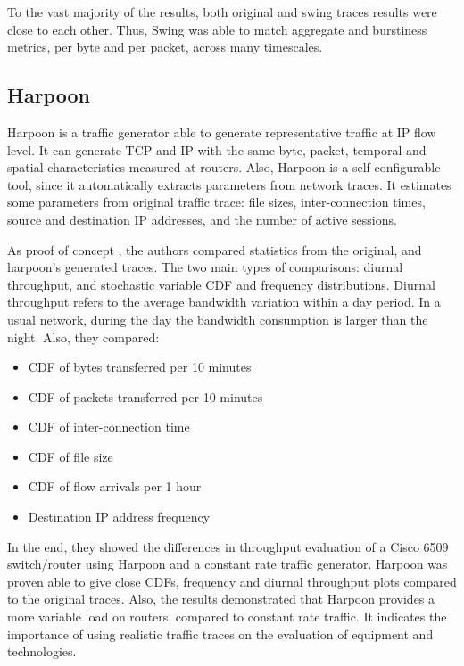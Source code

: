 To the vast majority of the results, both original and swing traces results were close to each other. Thus, Swing was able to match aggregate and burstiness metrics, per byte and per packet, across many timescales.

\subsection{Harpoon}

Harpoon\cite{harpoon-validation}\cite{harpoon-paper} is a traffic generator able to generate representative traffic at IP flow level. It can generate TCP and IP with the same byte, packet, temporal and spatial characteristics measured at routers. Also, Harpoon is a self-configurable tool, since it automatically extracts parameters from network traces. It estimates some parameters from original traffic trace: file sizes, inter-connection times, source and destination IP addresses, and the number of active sessions. 

As proof of concept \cite{harpoon-validation}, the authors compared statistics from the original, and harpoon’s generated traces. The two main types of comparisons: diurnal throughput, and stochastic variable CDF and frequency distributions. Diurnal throughput refers to the average bandwidth variation within a day period. In a usual network, during the day the bandwidth consumption is larger than the night. Also, they compared:

\begin{itemize}
\item CDF of bytes transferred per 10 minutes
\item CDF of packets transferred per 10 minutes
\item CDF of inter-connection time
\item CDF of file size
\item CDF of flow arrivals per 1 hour
\item Destination IP address frequency
\end{itemize}

In the end, they showed the differences in throughput evaluation of a Cisco 6509 switch/router using Harpoon and a constant rate traffic generator. Harpoon was proven able to give close CDFs, frequency and diurnal throughput plots compared to the original traces. Also, the results demonstrated that Harpoon provides a more variable load on routers, compared to constant rate traffic. It indicates the importance of using realistic traffic traces on the evaluation of equipment and technologies.

